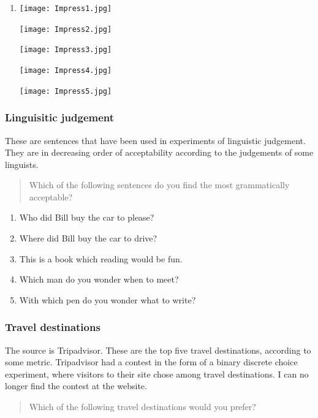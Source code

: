 \documentclass[11pt,letter]{amsart}
\begin{document}
\begin{enumerate}
\item \texttt{[image: Impress1.jpg]}

\texttt{[image: Impress2.jpg]}

\texttt{[image: Impress3.jpg]}

\texttt{[image: Impress4.jpg]}

\texttt{[image: Impress5.jpg]}
\end{enumerate}

\subsubsection{Linguisitic judgement}
These are sentences that have been used in experiments of linguistic judgement.
They are in decreasing order of acceptability according to the judgements of some linguists.

\begin{quotation}
Which of the following sentences do you find the most grammatically acceptable?
\end{quotation}

\begin{enumerate}
	\item Who did Bill buy the car to please?
	\item Where did Bill buy the car to drive?
	\item This is a book which reading would be fun.
	\item Which man do you wonder when to meet?
	\item With which pen do you wonder what to write?
\end{enumerate}

\subsubsection{Travel destinations}

The source is Tripadvisor. These are the top five travel destinations,
according to some metric. Tripadvisor had a contest in the form of a binary
discrete choice experiment, where visitors to their site chose among travel
destinations. I can no longer find the contest at the website.

\begin{quotation}
Which of the following travel destinations would you prefer?
\end{quotation}
\end{document}
